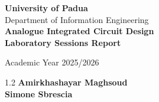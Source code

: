 \documentclass[12pt,a4paper]{report}
\begin{document}
\begin{titlepage}
    \thispagestyle{empty}
    \begin{center}
    \vspace*{3cm}
    
    
    \vspace{1cm}

    {\huge \textbf{University of Padua}}\\[0.5cm]
    {\large Department of Information Engineering}\\[2cm]

    {\color{unipdred}\Huge \textbf{Analogue Integrated Circuit Design}}\\[0.4cm]
    {\color{unipdred}\Huge \textbf{Laboratory Sessions Report}}

    \vspace{2cm}

    {\large Academic Year 2025/2026}

    \vfill

    \begin{flushleft}
    \begin{spacing}{1.2}
    {\LARGE \textbf{Amirkhashayar Maghsoud}} \\[0.4cm]
    {\LARGE \textbf{Simone Sbrescia}}
    \end{spacing}
    \end{flushleft}
    
    \vspace{1cm}
    \end{center}
\end{titlepage}

\tableofcontents
\clearpage






\end{document}
